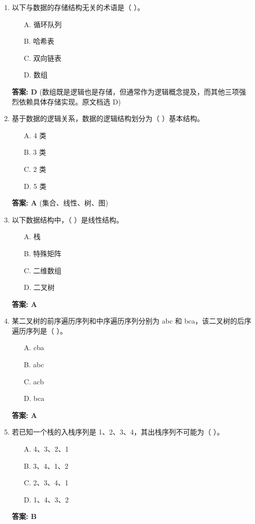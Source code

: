 \documentclass[12pt, a4paper]{article}
\begin{document}
\begin{enumerate}
    \item 以下与数据的存储结构无关的术语是（ ）。
    \begin{enumerate}
        \item[A.] 循环队列
        \item[B.] 哈希表
        \item[C.] 双向链表
        \item[D.] 数组
    \end{enumerate}
    \textbf{答案: D} (数组既是逻辑也是存储，但通常作为逻辑概念提及，而其他三项强烈依赖具体存储实现。原文档选 D)

    \item 基于数据的逻辑关系，数据的逻辑结构划分为（ ）基本结构。
    \begin{enumerate}
        \item[A.] 4 类
        \item[B.] 3 类
        \item[C.] 2 类
        \item[D.] 5 类
    \end{enumerate}
    \textbf{答案: A} (集合、线性、树、图)

    \item 以下数据结构中，（ ）是线性结构。
    \begin{enumerate}
        \item[A.] 栈
        \item[B.] 特殊矩阵
        \item[C.] 二维数组
        \item[D.] 二叉树
    \end{enumerate}
    \textbf{答案: A}

    \item 某二叉树的前序遍历序列和中序遍历序列分别为 abc 和 bca，该二叉树的后序遍历序列是（ ）。
    \begin{enumerate}
        \item[A.] cba
        \item[B.] abc
        \item[C.] acb
        \item[D.] bca
    \end{enumerate}
    \textbf{答案: A}

    \item 若已知一个栈的入栈序列是 1、2、3、4，其出栈序列不可能为（ ）。
    \begin{enumerate}
        \item[A.] 4、3、2、1
        \item[B.] 3、4、1、2
        \item[C.] 2、3、4、1
        \item[D.] 1、4、3、2
    \end{enumerate}
    \textbf{答案: B}


\end{enumerate}
\end{document}

